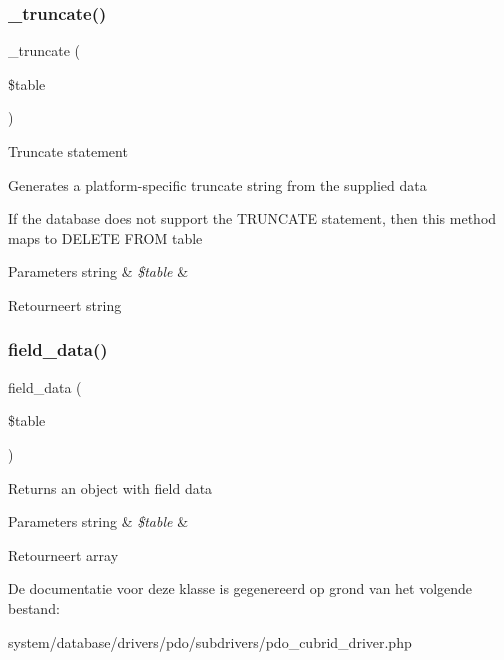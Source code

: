 \subsubsection{\texorpdfstring{\_truncate()}{\_truncate()}}
{\footnotesize\ttfamily \+\_\+truncate (\begin{DoxyParamCaption}\item[{}]{\$table }\end{DoxyParamCaption})\hspace{0.3cm}{\ttfamily [protected]}}

Truncate statement

Generates a platform-\/specific truncate string from the supplied data

If the database does not support the T\+R\+U\+N\+C\+A\+TE statement, then this method maps to \textquotesingle{}D\+E\+L\+E\+TE F\+R\+OM table\textquotesingle{}


\begin{DoxyParams}[1]{Parameters}
string & {\em \$table} & \\
\hline
\end{DoxyParams}
\begin{DoxyReturn}{Retourneert}
string 
\end{DoxyReturn}
\mbox{\label{class_c_i___d_b__pdo__cubrid__driver_a90355121e1ed009e0efdbd544ab56efa}} 
\subsubsection{\texorpdfstring{field\_data()}{field\_data()}}
{\footnotesize\ttfamily field\+\_\+data (\begin{DoxyParamCaption}\item[{}]{\$table }\end{DoxyParamCaption})}

Returns an object with field data


\begin{DoxyParams}[1]{Parameters}
string & {\em \$table} & \\
\hline
\end{DoxyParams}
\begin{DoxyReturn}{Retourneert}
array 
\end{DoxyReturn}


De documentatie voor deze klasse is gegenereerd op grond van het volgende bestand\+:\begin{DoxyCompactItemize}
\item 
system/database/drivers/pdo/subdrivers/pdo\+\_\+cubrid\+\_\+driver.\+php\end{DoxyCompactItemize}
